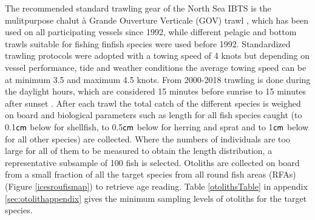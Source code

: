 \documentclass[a4paper 12pt]{article}
\numberwithin{equation}{section}
\newcommand{\cm}{\textnormal{\sffamily cm}\xspace}
\begin{document}
\indent The recommended standard trawling gear of the North Sea IBTS is the mulitpurpose chalut {\`a} Grande Ouverture Verticale (GOV) trawl \citep{ICES2012}, which has been used on all participating vessels since 1992, while different pelagic and bottom trawls suitable for fishing finfish species were used before 1992. Standardized trawling protocols were adopted with a towing speed of 4 knots but depending on vessel performance, tide and weather conditions the average towing speed can be at minimum 3.5 and maximum 4.5 knots. From 2000-2018 trawling is done during the daylight hours, which are considered 15 minutes before sunrise to 15 minutes  after sunset \citep{ICES2012}. After each trawl the total catch of the different species is weighed on board and biological parameters such as length for all fish species caught (to 0.1$\cm$ below for shellfish, to 0.5$\cm$ below for herring and sprat and to 1$\cm$ below for all other species) are collected. Where the numbers of individuals are too large for all of them  to be measured to obtain the length distribution, a representative subsample of 100 fish is selected. Otoliths are collected on board from a small fraction of all the target species from all  round fish areas (RFAs) (Figure \ref{icesroufismap}) to retrieve age reading. Table \ref{otolithsTable} in appendix \ref{sec:otolithappendix} gives the minimum sampling levels of otoliths for the target species.
\end{document}
